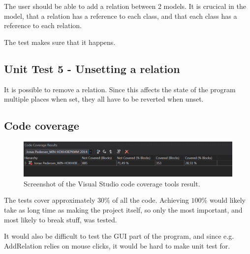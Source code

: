 The user should be able to add a relation between 2 models. It is crucical in
the model, that a relation has a reference to each class, and that each class has
a reference to each relation.

The test makes sure that it happens.

\subsection{Unit Test 5 - Unsetting a relation}

It is possible to remove a relation. Since this affects the state of the program
multiple places when set, they all have to be reverted when unset.


\subsection{Code coverage}

\begin{figure}
\centering
\includegraphics[width=0.85\linewidth]{img/coverage}
\caption{Screenshot of the Visual Studio code coverage tools result.}
\end{figure}

The tests cover approximately $30\%$ of all the code. Achieving $100\%$ would
likely take as long time as making the project itself, so only the most
important, and most likely to break stuff, was tested.

It would also be difficult to test the GUI part of the program, and since e.g.
AddRelation relies on mouse clicks, it would be hard to make unit test for.
